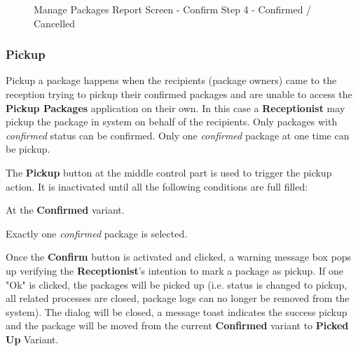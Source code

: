 \begin{figure}[H]
	\centering
	\hspace{5pt}
    \caption{Manage Packages Report Screen - Confirm Step 4 - Confirmed / Cancelled}
	\label{fig:MPReportConfirmDlgButton}
\end{figure}

\subsubsection{Pickup}

Pickup a package happens when the recipients (package owners) came to the reception trying to pickup their confirmed packages and are unable to access the \textbf{Pickup Packages} application on their own. In this case a \textbf{Receptionist} may pickup the package in system on behalf of the recipients. Only packages with \textit{confirmed} status can be confirmed. Only one \textit{confirmed} package at one time can be pickup.

The \textbf{Pickup} button at the middle control part is used to trigger the pickup action. It is inactivated until all the following conditions are full filled:

\begin{compactenum}
    \item At the \textbf{Confirmed} variant.
    \item Exactly one \textit{confirmed} package is selected.
\end{compactenum}

Once the \textbf{Confirm} button is activated and clicked, a warning message box pops up verifying the \textbf{Receptionist}'s intention to mark a package as pickup. If one "Ok" is clicked, the packages will be picked up (i.e. status is changed to pickup, all related processes are closed, package logs can no longer be removed from the system). The dialog will be closed, a message toast indicates the success pickup and the package will be moved from the current \textbf{Confirmed} variant to \textbf{Picked Up} Variant.

